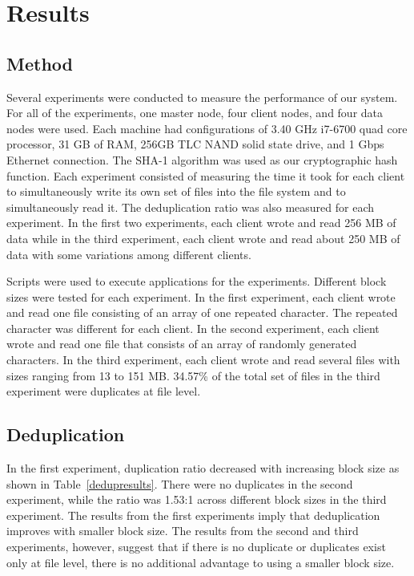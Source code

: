\documentclass[11pt,twocolumn]{article}
\begin{document}
\section {Results}\label{results}

\subsection{Method}\label{results:method}
Several experiments were conducted to measure the performance of our system. For all of the experiments, one master node, four client nodes, and four data nodes were used. Each machine had configurations of 3.40 GHz i7-6700 quad core processor, 31 GB of RAM, 256GB TLC NAND solid state drive, and 1 Gbps Ethernet connection. The SHA-1 algorithm was used as our cryptographic hash function. Each experiment consisted of measuring the time it took for each client to simultaneously write its own set of files into the file system and to simultaneously read it. The deduplication ratio was also measured for each experiment. In the first two experiments, each client wrote and read 256 MB of data while in the third experiment, each client wrote and read about 250 MB of data with some variations among different clients.

Scripts were used to execute applications for the experiments. Different block sizes were tested for each experiment. In the first experiment, each client wrote and read one file consisting of an array of one repeated character. The repeated character was different for each client. In the second experiment, each client wrote and read one file that consists of an array of randomly generated characters. In the third experiment, each client wrote and read several files with sizes ranging from 13 to 151 MB. 34.57\% of the total set of files in the third experiment were duplicates at file level.

\subsection{Deduplication}\label{results:deduplication}
In the first experiment, duplication ratio decreased with increasing block size as shown in Table~\ref{dedupresults}. There were no duplicates in the second experiment, while the ratio was 1.53:1 across different block sizes in the third experiment. The results from the first experiments imply that deduplication improves with smaller block size. The results from the second and third experiments, however, suggest that if there is no duplicate or duplicates exist only at file level, there is no additional advantage to using a smaller block size.
\end{document}
